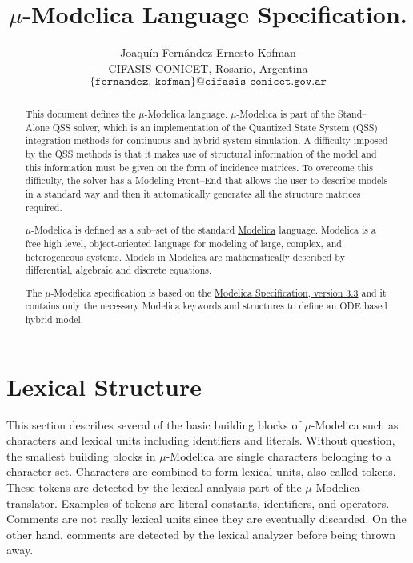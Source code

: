 \documentclass[11pt,a4paper,notitlepage]{report}
\begin{document}
\thispagestyle{empty}

\title{\textbf{$\mu$-Modelica Language Specification.}}

\author{ Joaquín Fernández \quad Ernesto Kofman\quad \\
       CIFASIS-CONICET, Rosario, Argentina \\
       $\texttt{\{fernandez, kofman\}@cifasis-conicet.gov.ar}$
}

\date{} %

\maketitle\thispagestyle{empty} %

\begin{abstract}
This document defines the $\mu$-Modelica language. $\mu$-Modelica is part of the Stand--Alone QSS solver, which is an implementation of the Quantized State System (QSS) integration methods for continuous and hybrid system simulation. A difficulty imposed by the QSS methods is that it makes use of structural information of the model and this information must be given on the form of incidence matrices.
To overcome this difficulty, the solver has a Modeling Front--End that allows the user to describe models in a standard way and then it automatically generates all the structure matrices required.

$\mu$-Modelica is defined as a sub--set of the standard \href{https://www.modelica.org}{Modelica} language. Modelica is a free high level, object-oriented language for modeling of large, complex, and heterogeneous systems. Models in Modelica are mathematically described by differential, algebraic and discrete equations. 

The $\mu$-Modelica specification is based on the \href{https://www.modelica.org/documents}{Modelica Specification, version 3.3} and it contains only the necessary Modelica keywords and structures to define an ODE based hybrid model.
\end{abstract}

\tableofcontents
\newpage
\chapter{Lexical Structure}\label{ch:lexical}

This section describes several of the basic building blocks of $\mu$-Modelica such as characters and lexical units including identifiers and literals. Without question, the smallest building blocks in $\mu$-Modelica are single characters belonging to a character set. Characters are combined to form lexical units, also called tokens. These tokens are detected by the lexical analysis part of the $\mu$-Modelica translator. Examples of tokens are literal constants, identifiers, and operators. Comments are not really lexical units since they are eventually discarded. On the other
hand, comments are detected by the lexical analyzer before being thrown away. 
\end{document}
